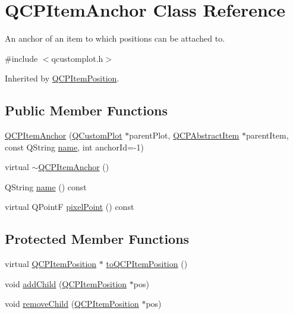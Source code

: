 \hypertarget{class_q_c_p_item_anchor}{\section{Q\-C\-P\-Item\-Anchor Class Reference}
\label{class_q_c_p_item_anchor}
}


An anchor of an item to which positions can be attached to.  




{\ttfamily \#include $<$qcustomplot.\-h$>$}



Inherited by \hyperlink{class_q_c_p_item_position}{Q\-C\-P\-Item\-Position}.

\subsection*{Public Member Functions}
\begin{DoxyCompactItemize}
\item 
\hyperlink{class_q_c_p_item_anchor_aeb6b681d2bf324db40a915d32ec5624f}{Q\-C\-P\-Item\-Anchor} (\hyperlink{class_q_custom_plot}{Q\-Custom\-Plot} $\ast$parent\-Plot, \hyperlink{class_q_c_p_abstract_item}{Q\-C\-P\-Abstract\-Item} $\ast$parent\-Item, const Q\-String \hyperlink{class_q_c_p_item_anchor_ac93984042a58c875e76847dc3e5f75fe}{name}, int anchor\-Id=-\/1)
\item 
virtual \hyperlink{class_q_c_p_item_anchor_a1868559407600688ee4d1a4621e81ceb}{$\sim$\-Q\-C\-P\-Item\-Anchor} ()
\item 
Q\-String \hyperlink{class_q_c_p_item_anchor_ac93984042a58c875e76847dc3e5f75fe}{name} () const 
\item 
virtual Q\-Point\-F \hyperlink{class_q_c_p_item_anchor_ae92def8f9297c5d73f5806c586517bb3}{pixel\-Point} () const 
\end{DoxyCompactItemize}
\subsection*{Protected Member Functions}
\begin{DoxyCompactItemize}
\item 
virtual \hyperlink{class_q_c_p_item_position}{Q\-C\-P\-Item\-Position} $\ast$ \hyperlink{class_q_c_p_item_anchor_a688325bfb121b71b7c8260a6aec6d67f}{to\-Q\-C\-P\-Item\-Position} ()
\item 
void \hyperlink{class_q_c_p_item_anchor_ad11517e2ce5c2f9a798e78fb45e2e0d0}{add\-Child} (\hyperlink{class_q_c_p_item_position}{Q\-C\-P\-Item\-Position} $\ast$pos)
\item 
void \hyperlink{class_q_c_p_item_anchor_ab65ec61984575f737f43c2bb59dd0d76}{remove\-Child} (\hyperlink{class_q_c_p_item_position}{Q\-C\-P\-Item\-Position} $\ast$pos)
\end{DoxyCompactItemize}
